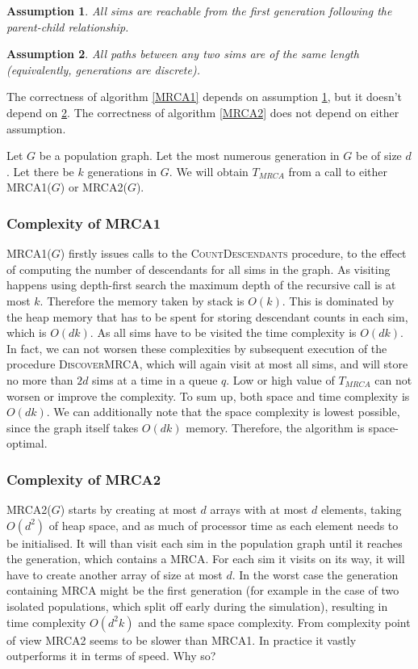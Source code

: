 \documentclass{l4proj}
\newtheorem{assum}{Assumption}
\begin{document}
\begin{assum}\label{reachability}
  All sims are reachable from the first generation following the parent-child relationship.
\end{assum}

\begin{assum}\label{discreteGen}
  All paths between any two sims are of the same length (equivalently, generations are discrete).
\end{assum}

The correctness of algorithm \ref{MRCA1} depends on assumption \ref{reachability}, but it doesn't depend on \ref{discreteGen}. The correctness of algorithm \ref{MRCA2} does not depend on either assumption.

Let $G$ be a population graph. Let the most numerous generation in $G$ be of size $d$. Let there be $k$ generations in $G$. We will obtain $T_{MRCA}$ from a call to either \textsc{MRCA1}($G$) or \textsc{MRCA2}($G$).

\subsubsection{Complexity of \textsc{MRCA1}}
\textsc{MRCA1}($G$) firstly issues calls to the \textsc{CountDescendants} procedure, to the effect of computing the number of descendants for all sims in the graph. As visiting happens using depth-first search the maximum depth of the recursive call is at most $k$. Therefore the memory taken by stack is $O(k)$. This is dominated by the heap memory that has to be spent for storing descendant counts in each sim, which is $O(dk)$. As all sims have to be visited the time complexity is $O(dk)$. In fact, we can not worsen these complexities by subsequent execution of the procedure \textsc{DiscoverMRCA}, which will again visit at most all sims, and will store no more than $2d$ sims at a time in a queue $q$. Low or high value of $T_{MRCA}$ can not worsen or improve the complexity. To sum up, both space and time complexity is $O(dk)$. We can additionally note that the space complexity is lowest possible, since the graph itself takes $O(dk)$ memory. Therefore, the algorithm is space-optimal.

\subsubsection{Complexity of \textsc{MRCA2}}
\textsc{MRCA2}($G$) starts by creating at most $d$ arrays with at most $d$ elements, taking $O(d^{2})$ of heap space, and as much of processor time as each element needs to be initialised. It will than visit each sim in the population graph until it reaches the generation, which contains a MRCA. For each sim it visits on its way, it will have to create another array of size at most $d$. In the worst case the generation containing MRCA might be the first generation (for example in the case of two isolated populations, which split off early during the simulation), resulting in time complexity $O(d^{2}k)$ and the same space complexity. From complexity point of view \textsc{MRCA2} seems to be slower than \textsc{MRCA1}. In practice it vastly outperforms it in terms of speed. Why so?
\end{document}
